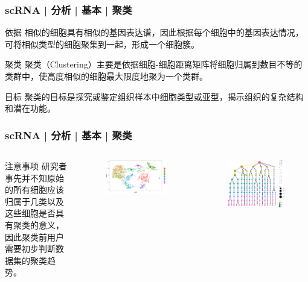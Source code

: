 \documentclass[11pt]{ctexbeamer}
\begin{document}
\begin{frame}
  \frametitle{scRNA | 分析 | 基本 | 聚类}
  \begin{block}{依据}
     相似的细胞具有相似的基因表达谱，因此根据每个细胞中的基因表达情况，可将相似类型的细胞聚集到一起，形成一个细胞簇。
  \end{block}
  \begin{block}{聚类}
	聚类（Clustering）主要是依据细胞-细胞距离矩阵将细胞归属到数目不等的类群中，使高度相似的细胞最大限度地聚为一个类群。
  \end{block}
  \begin{block}{目标}
	聚类的目标是探究或鉴定组织样本中细胞类型或亚型，揭示组织的复杂结构和潜在功能。
\end{block}
\end{frame}

\begin{frame}
  \frametitle{scRNA | 分析 | 基本 | 聚类}
  \begin{columns}
  	    \begin{block}{注意事项}
  		研究者事先并不知原始的所有细胞应该归属于几类以及这些细胞是否具有聚类的意义，因此聚类前用户需要初步判断数据集的聚类趋势。
  	\end{block}
      \begin{figure}
  	\includegraphics[width=\textwidth]{scRNA_clustering_01.png}
  \end{figure}
        \begin{figure}
  	\includegraphics[width=\textwidth]{scRNA_clustering_02.png}

\end{figure}
\end{columns}
\end{frame}
\end{document}

